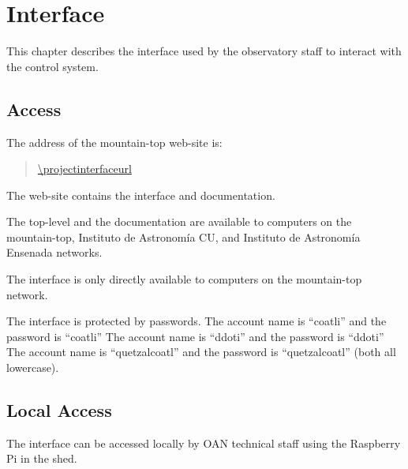 \chapter{Interface}
\label{chapter:interface}

This chapter describes the interface used by the observatory staff to interact with the {\projectname} control system.



\section{Access}

The address of the {\projectname} mountain-top web-site is:
\begin{quote}
    \url{\projectinterfaceurl}
\end{quote}

The web-site contains the interface and documentation.

The top-level and the documentation are available to computers on the mountain-top, Instituto de Astronomía CU, and Instituto de Astronomía Ensenada networks.

The interface is only directly available to computers on the mountain-top network.

The interface is protected by passwords.
\ifcoatli
The account name is “coatli” and the password is “coatli”
\fi
\ifddoti
The account name is “ddoti” and the password is “ddoti”
\fi
\ifquetzalcoatl
The account name is “quetzalcoatl” and the password is “quetzalcoatl”
\fi
(both all lowercase).

\section{Local Access}
\label{section:interface-local-access}

The interface can be accessed locally by OAN technical staff using the Raspberry Pi in the shed.

